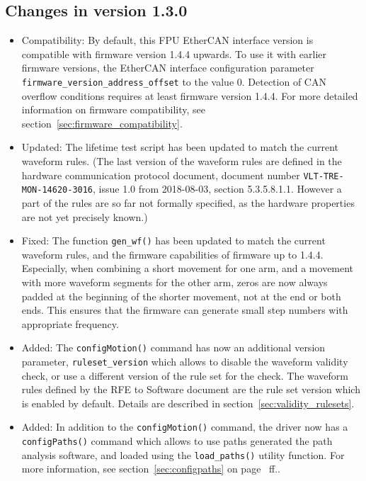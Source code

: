 \documentclass[11pt,a4paper]{scrartcl}
\begin{document}
\subsection*{Changes in version 1.3.0}
\begin{itemize}
\item Compatibility: By default, this FPU EtherCAN interface version is compatible
  with firmware version 1.4.4 upwards. To use it with earlier firmware
  versions, the EtherCAN interface configuration parameter
  \texttt{firmware\_version\_address\_offset} to the value
  0. Detection of CAN overflow conditions requires at least firmware
  version 1.4.4. For more detailed information on firmware
  compatibility, see section~\ref{sec:firmware_compatibility}.

\item Updated: The lifetime test script has been updated to match the
  current waveform rules. (The last version of the waveform rules are
  defined in the hardware communication protocol document, document
  number \texttt{VLT-TRE-MON-14620-3016}, issue 1.0 from 2018-08-03,
  section 5.3.5.8.1.1. However a part of the rules are so far not
  formally specified, as the hardware properties are not yet precisely
  known.)

\item Fixed: The function \texttt{gen\_wf()} has been updated
  to match the current waveform rules, and the firmware
  capabilities of firmware up to 1.4.4. Especially, when
  combining a short movement for one arm, and a movement with
  more waveform segments for the other arm, zeros are now
  always padded at the beginning of the shorter movement, not
  at the end or both ends. This ensures that the firmware
  can generate small step numbers with appropriate frequency.
  
  
\item Added: The \texttt{configMotion()} command has now an additional
  version parameter, \texttt{ruleset\_version} which allows to disable
  the waveform validity check, or use a different version of the rule
  set for the check.  The waveform rules defined by the RFE to
  Software document are the rule set version which is enabled by
  default. Details are described in
  section~\ref{sec:validity_rulesets}.

\item Added: In addition to the \texttt{configMotion()} command, the
  driver now has a \texttt{configPaths()} command which allows to use
  paths generated the path analysis software, and loaded using the
  \texttt{load\_paths()} utility function. For more information, see
  section~\ref{sec:configpaths} on page~\pageref{sec:configpaths} ff..


\end{itemize}
\end{document}
